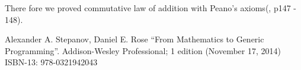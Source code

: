 \documentclass[UTF8]{article}
\begin{document}
There fore we proved commutative law of addition with Peano's axioms(\cite{StepanovRose15}, p147 - 148).

\ifx\wholebook\relax \else
\begin{thebibliography}{99}

Alexander A. Stepanov, Daniel E. Rose ``From Mathematics to Generic Programming''. Addison-Wesley Professional; 1 edition (November 17, 2014) ISBN-13: 978-0321942043

\end{thebibliography}

\expandafter\enddocument

\fi
\end{document}
